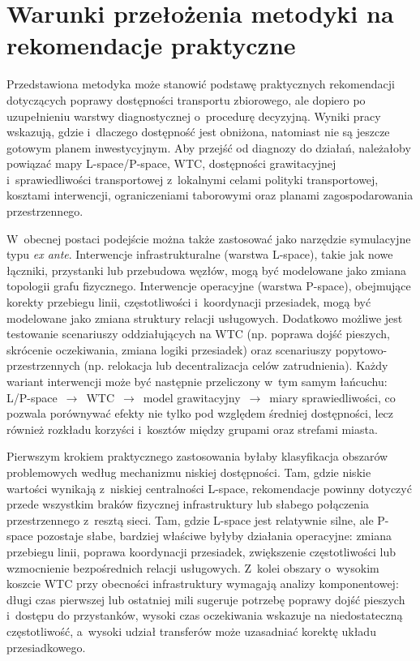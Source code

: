 \documentclass{pracamgr}
\begin{document}
\section{Warunki przełożenia metodyki na rekomendacje praktyczne}\label{section:ch5_praktyczne_zastosowanie}

Przedstawiona metodyka może stanowić podstawę praktycznych rekomendacji dotyczących poprawy dostępności transportu zbiorowego, ale dopiero po uzupełnieniu warstwy diagnostycznej o~procedurę decyzyjną. Wyniki pracy wskazują, gdzie i~dlaczego dostępność jest obniżona, natomiast nie są jeszcze gotowym planem inwestycyjnym. Aby przejść od diagnozy do działań, należałoby powiązać mapy \mbox{L-space}/\mbox{P-space}, \mbox{WTC}, dostępności grawitacyjnej i~sprawiedliwości transportowej z~lokalnymi celami polityki transportowej, kosztami interwencji, ograniczeniami taborowymi oraz planami zagospodarowania przestrzennego.

W~obecnej postaci podejście można także zastosować jako narzędzie symulacyjne typu \textit{ex ante}. Interwencje infrastrukturalne (warstwa \mbox{L-space}), takie jak nowe łączniki, przystanki lub przebudowa węzłów, mogą być modelowane jako zmiana topologii grafu fizycznego. Interwencje operacyjne (warstwa \mbox{P-space}), obejmujące korekty przebiegu linii, częstotliwości i~koordynacji przesiadek, mogą być modelowane jako zmiana struktury relacji usługowych. Dodatkowo możliwe jest testowanie scenariuszy oddziałujących na \mbox{WTC} (np. poprawa dojść pieszych, skrócenie oczekiwania, zmiana logiki przesiadek) oraz scenariuszy popytowo-przestrzennych (np. relokacja lub decentralizacja celów zatrudnienia). Każdy wariant interwencji może być następnie przeliczony w~tym samym łańcuchu: \mbox{L/P-space}~$\rightarrow$~\mbox{WTC}~$\rightarrow$~model grawitacyjny~$\rightarrow$~miary sprawiedliwości, co pozwala porównywać efekty nie tylko pod względem średniej dostępności, lecz również rozkładu korzyści i~kosztów między grupami oraz strefami miasta.

Pierwszym krokiem praktycznego zastosowania byłaby klasyfikacja obszarów problemowych według mechanizmu niskiej dostępności. Tam, gdzie niskie wartości wynikają z~niskiej centralności \mbox{L-space}, rekomendacje powinny dotyczyć przede wszystkim braków fizycznej infrastruktury lub słabego połączenia przestrzennego z~resztą sieci. Tam, gdzie \mbox{L-space} jest relatywnie silne, ale \mbox{P-space} pozostaje słabe, bardziej właściwe byłyby działania operacyjne: zmiana przebiegu linii, poprawa koordynacji przesiadek, zwiększenie częstotliwości lub wzmocnienie bezpośrednich relacji usługowych. Z~kolei obszary o~wysokim koszcie \mbox{WTC} przy obecności infrastruktury wymagają analizy komponentowej: długi czas pierwszej lub ostatniej mili sugeruje potrzebę poprawy dojść pieszych i~dostępu do przystanków, wysoki czas oczekiwania wskazuje na niedostateczną częstotliwość, a~wysoki udział transferów może uzasadniać korektę układu przesiadkowego.
\end{document}
